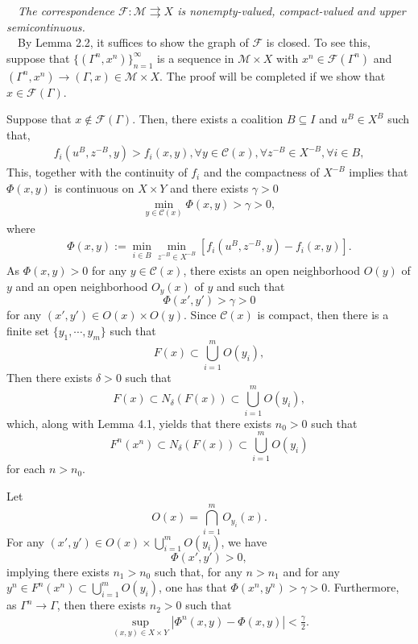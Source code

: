 ~~{\it The correspondence
$\mathcal{F}:\mathcal{M}\rightrightarrows X$ is
nonempty-valued, compact-valued and upper semicontinuous.}
\\

~~By Lemma 2.2, it suffices to show
the graph of $\mathcal{F}$ is closed. To see this,
suppose that $\{(\Gamma^n,x^n)\}^\infty_{n=1}$ is a
sequence in $\mathcal{M}\times X$ with $x^n\in \mathcal{F}(\Gamma^n)$ and
$(\Gamma^n,x^n)\longrightarrow (\Gamma,x)\in \mathcal{M}\times X$.
The proof will be completed if we show that $x\in \mathcal{F}(\Gamma)$.

Suppose that $x\not\in \mathcal{F}(\Gamma)$.
Then,  there exists a coalition $B\subseteq I$ and $u^B\in X^B$ such that,
\begin{eqnarray*}
f_i(u^B,z^{-B},y)>f_i(x,y),\forall y\in \mathcal{C}(x),\forall z^{-B}\in X^{-B},\forall i\in B,
\end{eqnarray*}
This, together with the continuity of $f_i$ and the compactness of $X^{-B}$ implies that
$\Phi(x,y)$ is continuous on $X\times Y$ and there exists $\gamma>0$
\begin{eqnarray*}
\min_{y\in \mathcal{C}(x)}\Phi(x,y)>\gamma>0,
\end{eqnarray*}
where
\begin{eqnarray*}
\Phi(x,y):=\min_{i\in B}\min_{z^{-B}\in X^{-B}}[f_i(u^B,z^{-B},y)-f_i(x,y)].
\end{eqnarray*}
As $\Phi(x,y)>0$ for any $y\in \mathcal{C}(x)$, there exists
 an open neighborhood
$O(y)$ of $y$ and an open neighborhood $O_y(x)$ of $y$ and such that
 $$\Phi(x',y')>\gamma>0$$ for any $(x',y')\in O(x)\times O(y)$.
 Since $\mathcal{C}(x)$ is compact, then there is
a finite set $\{y_1,\cdots,y_m\}$ such that $$F(x)\subset \bigcup^m_{i=1}O(y_i),$$
Then there exists $\delta>0$ such that
$$F(x)\subset N_\delta(F(x))\subset \bigcup^m_{i=1}O(y_i),$$
which, along with Lemma 4.1, yields that
there exists $n_0>0$ such that
$$F^n(x^n)\subset N_\delta(F(x))\subset\bigcup^m_{i=1}O(y_i)$$
for each $n>n_0$.

Let $$O(x)=\bigcap^m_{i=1}O_{y_i}(x).$$ For any
$(x',y')\in O(x)\times \bigcup^m_{i=1}O(y_i)$, we have
$$\Phi(x',y')>0,$$
implying there exists $n_1>n_0$ such that,
for any $n>n_1$ and for
any $y^n\in F^n(x^n)\subset\bigcup^m_{i=1}O(y_i)$,  one has that
$\Phi(x^n,y^n)>\gamma>0$. Furthermore, as $\Gamma^n\longrightarrow \Gamma$,
then there exists $n_2>0$ such that
\begin{eqnarray*}
\sup_{(x,y)\in X\times Y}|\Phi^n(x,y)-\Phi(x,y)|<\frac{\gamma}{2}.
\end{eqnarray*}

